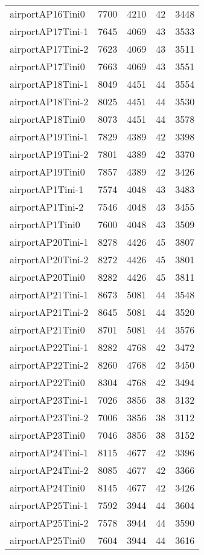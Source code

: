 \begin{longtable}{lrrrr}
airportAP16Tini0 & 7700 & 4210 & 42 & 3448 \\
airportAP17Tini-1 & 7645 & 4069 & 43 & 3533 \\
airportAP17Tini-2 & 7623 & 4069 & 43 & 3511 \\
airportAP17Tini0 & 7663 & 4069 & 43 & 3551 \\
airportAP18Tini-1 & 8049 & 4451 & 44 & 3554 \\
airportAP18Tini-2 & 8025 & 4451 & 44 & 3530 \\
airportAP18Tini0 & 8073 & 4451 & 44 & 3578 \\
airportAP19Tini-1 & 7829 & 4389 & 42 & 3398 \\
airportAP19Tini-2 & 7801 & 4389 & 42 & 3370 \\
airportAP19Tini0 & 7857 & 4389 & 42 & 3426 \\
airportAP1Tini-1 & 7574 & 4048 & 43 & 3483 \\
airportAP1Tini-2 & 7546 & 4048 & 43 & 3455 \\
airportAP1Tini0 & 7600 & 4048 & 43 & 3509 \\
airportAP20Tini-1 & 8278 & 4426 & 45 & 3807 \\
airportAP20Tini-2 & 8272 & 4426 & 45 & 3801 \\
airportAP20Tini0 & 8282 & 4426 & 45 & 3811 \\
airportAP21Tini-1 & 8673 & 5081 & 44 & 3548 \\
airportAP21Tini-2 & 8645 & 5081 & 44 & 3520 \\
airportAP21Tini0 & 8701 & 5081 & 44 & 3576 \\
airportAP22Tini-1 & 8282 & 4768 & 42 & 3472 \\
airportAP22Tini-2 & 8260 & 4768 & 42 & 3450 \\
airportAP22Tini0 & 8304 & 4768 & 42 & 3494 \\
airportAP23Tini-1 & 7026 & 3856 & 38 & 3132 \\
airportAP23Tini-2 & 7006 & 3856 & 38 & 3112 \\
airportAP23Tini0 & 7046 & 3856 & 38 & 3152 \\
airportAP24Tini-1 & 8115 & 4677 & 42 & 3396 \\
airportAP24Tini-2 & 8085 & 4677 & 42 & 3366 \\
airportAP24Tini0 & 8145 & 4677 & 42 & 3426 \\
airportAP25Tini-1 & 7592 & 3944 & 44 & 3604 \\
airportAP25Tini-2 & 7578 & 3944 & 44 & 3590 \\
airportAP25Tini0 & 7604 & 3944 & 44 & 3616 \\

\end{longtable}
